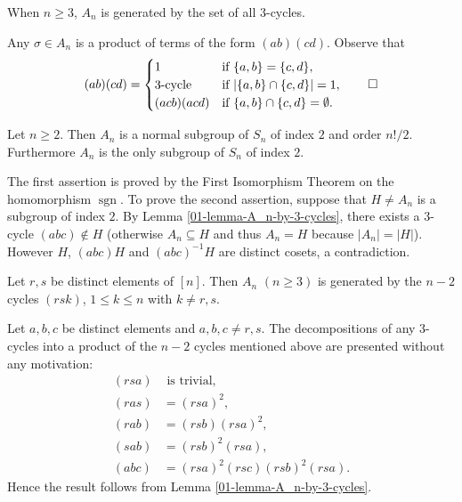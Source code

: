 \begin{lemma} \label{01-lemma-A_n-by-3-cycles}
	When $n\geq 3$, $A_n$ is generated by the set of all $3$-cycles.
\end{lemma}
\begin{sketch}
	Any $\sigma\in A_n$ is a product of terms of the form $(ab)(cd)$. Observe that
	\begin{equation*}
		(ab)(cd) = \begin{cases}
			1 &\text{if }\{a,b\} = \{c,d\}, \\
			3\text{-cycle} &\text{if }|\{a,b\} \cap \{c,d\}|=1,
			\\
			(acb)(acd) & \text{if }\{a,b\} \cap \{c,d\} = \emptyset. 
		\end{cases}\qedhere
	\end{equation*}
\end{sketch}
\begin{theorem}
	Let $n\geq 2$. Then $A_n$ is a normal subgroup of $S_n$ of index $2$ and order $n!/2$. Furthermore $A_n$ is the only subgroup of $S_n$ of index $2$.
\end{theorem}
\begin{sketch}
	The first assertion is proved by the First Isomorphism Theorem on the homomorphism $\operatorname{sgn}$. To prove the second assertion, suppose that $H\neq A_n$ is a subgroup of index $2$. By Lemma \ref{01-lemma-A_n-by-3-cycles}, there exists a $3$-cycle $(abc)\not\in H$ (otherwise $A_n\subseteq H$ and thus $A_n = H$ because $|A_n|= |H|$). However $H$, $(abc)H$ and $(abc)^{-1}H$ are distinct cosets, a contradiction.
\end{sketch}
\begin{lemma} \label{lemma-A_n-gen-by-n-2-cycles}
	Let $r,s$ be distinct elements of $[n]$. Then $A_n$  $(n \geq 3)$ is generated by the $n-2$ cycles $(rsk)$, $1\leq k\leq n$ with $k\neq r,s$.
\end{lemma}
\begin{sketch}
	Let $a,b,c$ be distinct elements and $a,b,c\neq r,s$. The decompositions of any $3$-cycles into a product of the $n-2$ cycles mentioned above are presented without any motivation:
	\begin{align*}
		(rsa)& \text{ is trivial},
		\\
		(ras) &= (rsa)^2,
		\\
		(rab) &= (rsb)(rsa)^2,
		\\
		(sab) &= (rsb)^2(rsa),
		\\
		(abc) &= (rsa)^2(rsc)(rsb)^2(rsa).
	\end{align*}
	Hence the result follows from Lemma \ref{01-lemma-A_n-by-3-cycles}.
\end{sketch}
